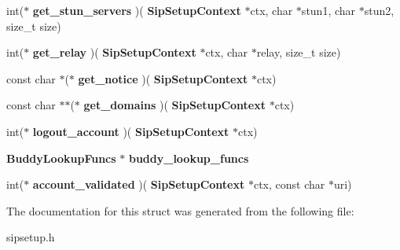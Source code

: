 \begin{DoxyCompactItemize}
\item 
\mbox{\label{struct__SipSetup_a3ef33d2a3a9449f20cff33cb3e641ab4}} 
int($\ast$ {\bfseries get\+\_\+stun\+\_\+servers} )(\textbf{ Sip\+Setup\+Context} $\ast$ctx, char $\ast$stun1, char $\ast$stun2, size\+\_\+t size)
\item 
\mbox{\label{struct__SipSetup_a58b7f36cf7033b65f5a1530209524bfa}} 
int($\ast$ {\bfseries get\+\_\+relay} )(\textbf{ Sip\+Setup\+Context} $\ast$ctx, char $\ast$relay, size\+\_\+t size)
\item 
\mbox{\label{struct__SipSetup_a94364a18fc25c6285c9e4e28e6ea54bd}} 
const char $\ast$($\ast$ {\bfseries get\+\_\+notice} )(\textbf{ Sip\+Setup\+Context} $\ast$ctx)
\item 
\mbox{\label{struct__SipSetup_a25848ad1f32d6b8d9c42c0f6b909d816}} 
const char $\ast$$\ast$($\ast$ {\bfseries get\+\_\+domains} )(\textbf{ Sip\+Setup\+Context} $\ast$ctx)
\item 
\mbox{\label{struct__SipSetup_a1ba2a01b45a74b8df2e58dda11f63326}} 
int($\ast$ {\bfseries logout\+\_\+account} )(\textbf{ Sip\+Setup\+Context} $\ast$ctx)
\item 
\mbox{\label{struct__SipSetup_a73f62790828263eb3fe1119063b49dc5}} 
\textbf{ Buddy\+Lookup\+Funcs} $\ast$ {\bfseries buddy\+\_\+lookup\+\_\+funcs}
\item 
\mbox{\label{struct__SipSetup_ae673aaa952386d08f7066ca0f5000474}} 
int($\ast$ {\bfseries account\+\_\+validated} )(\textbf{ Sip\+Setup\+Context} $\ast$ctx, const char $\ast$uri)
\end{DoxyCompactItemize}


The documentation for this struct was generated from the following file\+:\begin{DoxyCompactItemize}
\item 
sipsetup.\+h\end{DoxyCompactItemize}
